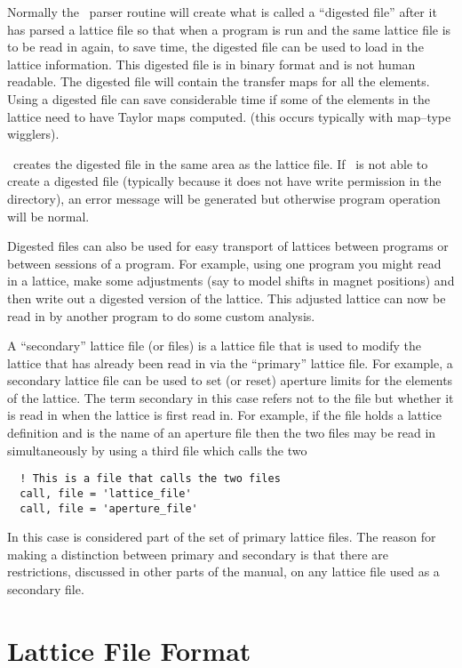 Normally the \bmad\ parser routine will create what is called a
``digested file'' after it has parsed a lattice file so that when a
program is run and the same lattice file is to be read in again, to save
time, the digested file can be used to load in the lattice information.
This digested file is in binary format and is not human readable. The
digested file will contain the transfer maps for all the elements. 
Using a digested file can save considerable time if some of the
elements in the lattice need to have Taylor maps computed.
(this occurs typically with map--type wigglers).

\bmad\ creates the digested file in the same area as the lattice file.
If \bmad\ is not able to create a digested file (typically because it
does not have write permission in the directory), an error message will
be generated but otherwise program operation will be normal.

Digested files can also be used for easy transport of lattices between
programs or between sessions of a program. For example, using one
program you might read in a lattice, make some adjustments (say to model
shifts in magnet positions) and then write out a digested version of the
lattice. This adjusted lattice can now be read in by another program to
do some custom analysis.

A ``secondary'' lattice file (or files) is a lattice file that is used to modify
the lattice that has already been read in via the ``primary'' lattice
file.  For example, a secondary lattice file can be used to set (or
reset) aperture limits for the elements of the lattice.  The term
secondary in this case refers not to the file but whether it is read
in when the lattice is first read in. For example, if the file
 holds a lattice definition and  is
the name of an aperture file then the two files may be read in simultaneously
by using a third file which calls the two
\begin{verbatim}
  ! This is a file that calls the two files
  call, file = 'lattice_file'
  call, file = 'aperture_file'
\end{verbatim}
In this case  is considered part of the set of
primary lattice files.  The reason for making a distinction between
primary and secondary is that there are restrictions, discussed in
other parts of the manual, on any lattice file used as a secondary
file.


\section{Lattice File Format}

